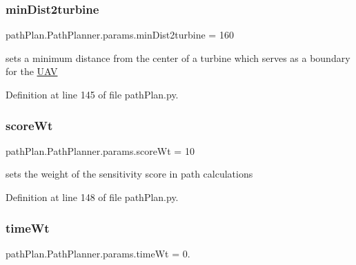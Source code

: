 \subsubsection{\texorpdfstring{min\+Dist2turbine}{minDist2turbine}}
{\footnotesize\ttfamily path\+Plan.\+Path\+Planner.\+params.\+min\+Dist2turbine = 160\hspace{0.3cm}{\ttfamily [static]}}



sets a minimum distance from the center of a turbine which serves as a boundary for the \mbox{\hyperlink{classpath_plan_1_1_u_a_v}{U\+AV}} 



Definition at line 145 of file path\+Plan.\+py.

\mbox{\label{classpath_plan_1_1_path_planner_1_1params_aae56a5ff040506a7653180736166bc91}} 
\subsubsection{\texorpdfstring{score\+Wt}{scoreWt}}
{\footnotesize\ttfamily path\+Plan.\+Path\+Planner.\+params.\+score\+Wt = 10\hspace{0.3cm}{\ttfamily [static]}}



sets the weight of the sensitivity score in path calculations 



Definition at line 148 of file path\+Plan.\+py.

\mbox{\label{classpath_plan_1_1_path_planner_1_1params_aca35113628a0f6ca96f5a1d576e74203}} 
\subsubsection{\texorpdfstring{time\+Wt}{timeWt}}
{\footnotesize\ttfamily path\+Plan.\+Path\+Planner.\+params.\+time\+Wt = 0.\hspace{0.3cm}{\ttfamily [static]}}



